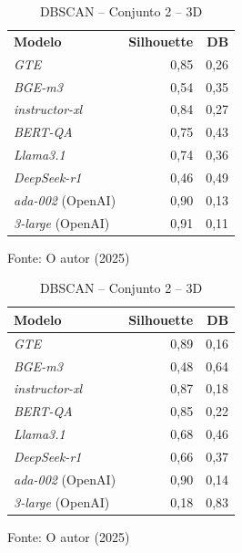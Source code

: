 \begin{table}[H]
    \vspace{5mm} %

    \begin{minipage}{0.48\textwidth}
        \caption{DBSCAN -- Conjunto 1 -- 3D}
        \centering
        \begin{tabular}{ l r r }
            \hline
            \textbf{Modelo} & \textbf{Silhouette} & \textbf{DB} \\  
            \textit{GTE} & 0,85 & 0,26 \\
            \textit{BGE-m3} & 0,54 & 0,35 \\
            \textit{instructor-xl} & 0,84 & 0,27 \\
            \textit{BERT-QA} & 0,75 & 0,43 \\
            \textit{Llama3.1} & 0,74 & 0,36 \\
            \textit{DeepSeek-r1} & 0,46 & 0,49 \\
            \textit{ada-002} (OpenAI) & 0,90 & 0,13 \\
            \textit{3-large} (OpenAI) & 0,91 & 0,11 \\
            \hline
        \end{tabular}
        \vspace{2mm}
        \small Fonte: O autor (2025)
        \label{tab:dbscan-conjunto-documentos1-com-reducao}
    \end{minipage}
    \hfill
    \begin{minipage}{0.48\textwidth}
        \caption{DBSCAN -- Conjunto 2 -- 3D}
        \centering
        \begin{tabular}{ l r r }
            \hline
            \textbf{Modelo} & \textbf{Silhouette} & \textbf{DB} \\  
            \hline
            \textit{GTE} & 0,89 & 0,16 \\
            \textit{BGE-m3} & 0,48 & 0,64 \\
            \textit{instructor-xl} & 0,87 & 0,18 \\
            \textit{BERT-QA} & 0,85 & 0,22 \\
            \textit{Llama3.1} & 0,68 & 0,46 \\
            \textit{DeepSeek-r1} & 0,66 & 0,37 \\
            \textit{ada-002} (OpenAI) & 0,90 & 0,14 \\
            \textit{3-large} (OpenAI) & 0,18 & 0,83 \\
            \hline
        \end{tabular}
        \vspace{2mm}
        \small Fonte: O autor (2025)
        \label{tab:dbscan-conjunto-documentos2-com-reducao}
    \end{minipage}
\end{table}

